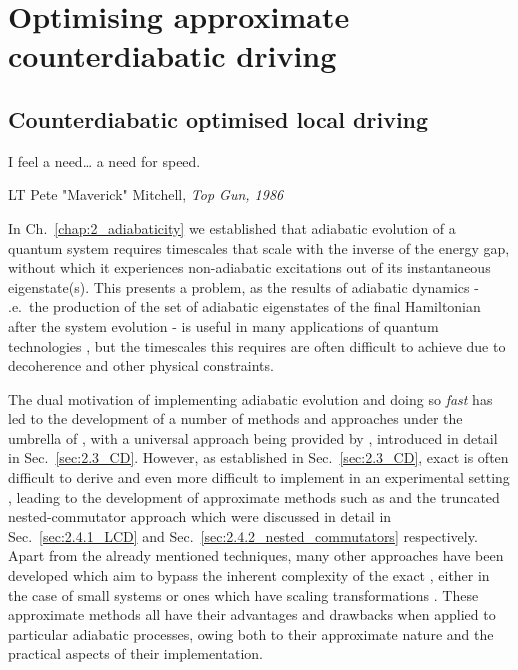 \part{Optimising approximate counterdiabatic driving}\label{part:COLD}

\chapter{Counterdiabatic optimised local driving}\label{chap:4_COLD}

\epigraph{I feel a need… a need for speed.}{LT Pete "Maverick" Mitchell, \emph{Top Gun, 1986}}

In Ch.~\ref{chap:2_adiabaticity} we established that adiabatic evolution of a quantum system requires timescales that scale with the inverse of the energy gap, without which it experiences non-adiabatic excitations out of its instantaneous eigenstate(s). This presents a problem, as the results of adiabatic dynamics - \@i.e.~the production of the set of adiabatic eigenstates of the final Hamiltonian after the system evolution - is useful in many applications of quantum technologies \cite{dimitrova_many-body_2023, campo_more_2014, ebadi_quantum_2022}, but the timescales this requires are often difficult to achieve due to decoherence and other physical constraints. 

The dual motivation of implementing adiabatic evolution and doing so \emph{fast} has led to the development of a number of methods and approaches under the umbrella of  \cite{guery-odelin_shortcuts_2019, torrontegui_chapter_2013}, with a universal  approach being provided by  \cite{berry_transitionless_2009, demirplak_adiabatic_2003}, introduced in detail in Sec.~\ref{sec:2.3_CD}. However, as established in Sec.~\ref{sec:2.3_CD}, exact  is often difficult to derive and even more difficult to implement in an experimental setting \cite{meier_counterdiabatic_2020, ban_counter-diabatic_2014}, leading to the development of approximate methods such as  \cite{sels_minimizing_2017} and the truncated nested-commutator approach \cite{claeys_floquet-engineering_2019} which were discussed in detail in Sec.~\ref{sec:2.4.1_LCD} and Sec.~\ref{sec:2.4.2_nested_commutators} respectively. Apart from the already mentioned techniques, many other approaches \cite{saberi_adiabatic_2014, campbell_shortcut_2015, whitty_quantum_2020} have been developed which aim to bypass the inherent complexity of the exact , either in the case of small systems or ones which have scaling transformations \cite{del_campo_shortcuts_2013, deffner_classical_2014, deng_superadiabatic_2018}. These approximate methods all have their advantages and drawbacks when applied to particular adiabatic processes, owing both to their approximate nature and the practical aspects of their implementation.  

